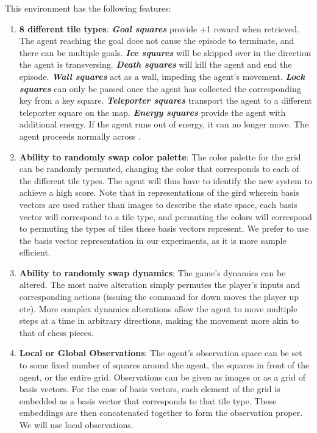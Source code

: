 \documentclass{article} %
\begin{document}
This environment has the following features: 
\begin{enumerate}
    \item \textbf{8 different tile types}: \emph{\textbf{Goal squares}} provide +1 reward when retrieved. The agent reaching the goal does not cause the episode to terminate, and there can be multiple goals. \emph{\textbf{Ice squares}} will be skipped over in the direction the agent is transversing. \emph{\textbf{Death squares}} will kill the agent and end the episode. \emph{\textbf{Wall squares}} act as a wall, impeding the agent's movement. \emph{\textbf{Lock squares}} can only be passed once the agent has collected the corresponding key from a key square. \emph{\textbf{Teleporter squares}} transport the agent to a different teleporter square on the map. \emph{\textbf{Energy squares}} provide the agent with additional energy. If the agent runs out of energy, it can no longer move. The agent proceeds normally across . 
    \item \textbf{Ability to randomly swap color palette}: The color palette for the grid can be randomly permuted, changing the color that corresponds to each of the different tile types. The agent will thus have to identify the new system to achieve a high score. Note that in representations of the gird wherein basis vectors are used rather than images to describe the state space, each basis vector will correspond to a tile type, and permuting the colors will correspond to permuting the types of tiles these basis vectors represent. We prefer to use the basis vector representation in our experiments, as it is more sample efficient.
    \item \textbf{Ability to randomly swap dynamics}: The game's dynamics can be altered. The most naive alteration simply permutes the player's inputs and corresponding actions (issuing the command for down moves the player up etc). More complex dynamics alterations allow the agent to move multiple steps at a time in arbitrary directions, making the movement more akin to that of chess pieces. 
    \item \textbf{Local or Global Observations}: The agent's observation space can be set to some fixed number of squares around the agent, the squares in front of the agent, or the entire grid. Observations can be given as images or as a grid of basis vectors. For the case of basis vectors, each element of the grid is embedded as a basis vector that corresponds to that tile type. These embeddings are then concatenated together to form the observation proper.  We will use local observations. 
    

\end{enumerate}
\end{document}
